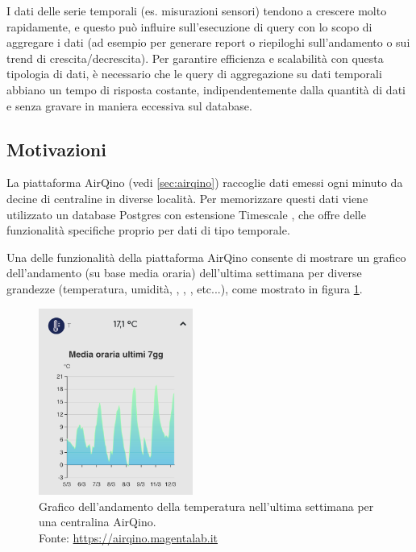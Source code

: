 I dati delle serie temporali (es. misurazioni sensori) tendono a crescere molto rapidamente, e questo può influire sull'esecuzione di query con lo scopo di aggregare i dati (ad esempio per generare report o riepiloghi sull'andamento o sui trend di crescita/decrescita). Per garantire efficienza e scalabilità con questa tipologia di dati, è necessario che le query di aggregazione su dati temporali abbiano un tempo di risposta costante, indipendentemente dalla quantità di dati e senza gravare in maniera eccessiva sul database.

\subsection{Motivazioni}\label{ssec:cont-aggr-motivazioni}
La piattaforma AirQino (vedi \ref{sec:airqino}) raccoglie dati emessi ogni minuto da decine di centraline in diverse località. Per memorizzare questi dati viene utilizzato un database Postgres \cite{postgres} con estensione Timescale \cite{timescale}, che offre delle funzionalità specifiche proprio per dati di tipo temporale.

Una delle funzionalità della piattaforma AirQino consente di mostrare un grafico dell'andamento (su base media oraria) dell'ultima settimana per diverse grandezze (temperatura, umidità, , , ,  etc...), come mostrato in figura \ref{fig:airqino-temp}.

\begin{figure}[H]
\centering
\captionsetup{justification=centering}
\includegraphics[width=0.45\textwidth,height=\textheight,keepaspectratio]{img/airqino_temp}
\caption{Grafico dell'andamento della temperatura nell'ultima settimana per una centralina AirQino.\\Fonte: \url{https://airqino.magentalab.it}}
\label{fig:airqino-temp}
\end{figure}

